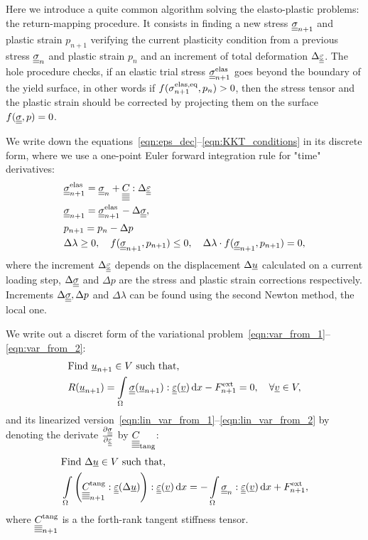 \documentclass[12pt]{article}
\begin{document}
Here we introduce a quite common algorithm solving the elasto-plastic problems: the return-mapping procedure. It consists in finding a new stress $\underline{\underline{\sigma}}_{n+1}$ and plastic strain $p_{n+1}$ verifying the current plasticity condition from a previous stress $\underline{\underline{\sigma}}_{n}$ and plastic strain $p_n$ and an increment of total deformation $\Delta\underline{\underline{\varepsilon}}$. The hole procedure checks, if an elastic trial stress $\underline{\underline{\sigma}}_{n+1}^{\text{elas}}$ goes beyond the boundary of the yield surface, in other words if $f(\sigma_{n+1}^\text{elas,eq}, p_n) > 0$, then the stress tensor and the plastic strain should be corrected by projecting them on the surface $f(\underline{\underline{\sigma}}, p) = 0$. 

We write down the equations~\ref{eqn:eps_dec}--\ref{eqn:KKT_conditions} in its discrete form, where we use a one-point Euler forward integration rule for "time" derivatives:
\begin{align}
    & \uusigmanelas = \uusigma_n + \uuuuC{} : \Delta\uueps \label{eqn:return-mapping_1}\\
    & \uusigman = \uusigmanelas - \Delta\uusigma, \\
    & p_{n+1} = p_n - \Delta p \\%
    & \Delta\lambda \geq 0, \quad f(\uusigman, p_{n+1}) \leq 0, \quad \Delta\lambda\cdot f(\uusigman, p_{n+1}) = 0, \label{eqn:return-mapping_end}
\end{align}
where the increment $\Delta\underline{\underline{\varepsilon}}$ depends on the displacement $\Delta\underline{u}$ calculated on a current loading step, $\Delta\underline{\underline{\sigma}}$ and $\Delta p$ are the stress and plastic strain corrections respectively. Increments $\Delta\underline{\underline{\sigma}}, \Delta p$ and $\Delta\lambda$ can be found using the second Newton method, the local one.

We write out a discret form of the variational problem~\ref{eqn:var_from_1}--\ref{eqn:var_from_2}:
\begin{align}
    & \text{Find } \underline{u}_{n+1} \in V \text{ such that,} \label{eqn:var_disc_from_1} \\ 
    & R(\underline{u}_{n+1}) = \int\limits_\Omega\underline{\underline{\sigma}}(\underline{u}_{n+1}) : \underline{\underline{\varepsilon}}(\underline{v}) \, \mathrm{d} x - F_{n+1}^\text{ext} = 0, \quad \forall \underline{v} \in V \label{eqn:var_disc_from_2},
\end{align}
and its linearized version~\ref{eqn:lin_var_from_1}--\ref{eqn:lin_var_from_2} by denoting the derivate $\frac{\partial\underline{\underline{\sigma}}}{\partial\underline{\underline{\varepsilon}}}$ by $\underline{\underline{\underline{\underline{C_{}}}}}_{\text{tang}}$:
\begin{align}
    & \text{Find } \Delta\underline{u} \in V \text{ such that,} \label{eqn:lin_var_disc_from_1} \\ 
    & \int\limits_\Omega \left(\underline{\underline{\underline{\underline{C_{}}}}}_{n+1}^\text{tang} : \underline{\underline{\varepsilon}}(\Delta\underline{u})\right) : \underline{\underline{\varepsilon}}(\underline{v}) \, \mathrm{d} x = -\int\limits_\Omega\underline{\underline{\sigma}}_n : \underline{\underline{\varepsilon}}(\underline{v}) \, \mathrm{d} x + F^\text{ext}_{n+1} \label{eqn:lin_var_disc_from_2},
\end{align}
where $\underline{\underline{\underline{\underline{C_{}}}}}_{n+1}^{\text{tang}}$ is a the forth-rank tangent stiffness tensor.
\end{document}
